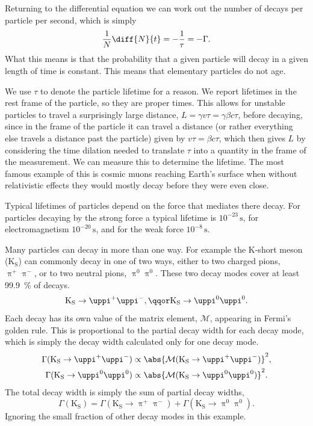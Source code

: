 \documentclass[fleqn]{NotesClass}
\makeatletter
\newcommand{\PBASE@pion}{\uppi}
\newcommand{\Ppiplus}{\ensuremath{\PBASE@pion^+}}
\newcommand{\Ppiminus}{\ensuremath{\PBASE@pion^-}}
\newcommand{\Ppineutral}{\ensuremath{\PBASE@pion^0}}
\newcommand{\Ppizero}{\Ppineutral}
\newcommand{\PBASE@kaon}{\mathrm{K}}
\newcommand{\PKshort}{\ensuremath{\PBASE@kaon_{\mathrm{S}}}}
\newcommand*{\matrixelement}{\mathcal{M}}
\makeatother
\begin{document}
    Returning to the differential equation we can work out the number of decays per particle per second, which is simply
    \begin{equation}
        \frac{1}{N}\diff{N}{t} = -\frac{1}{\tau} = -\Gamma.
    \end{equation}
    What this means is that the probability that a given particle will decay in a given length of time is constant.
    This means that elementary particles do not age.
    
    We use \(\tau\) to denote the particle lifetime for a reason.
    We report lifetimes in the rest frame of the particle, so they are proper times.
    This allows for unstable particles to travel a surprisingly large distance, \(L = \gamma v\tau = \gamma\beta c\tau\), before decaying, since in the frame of the particle it can travel a distance (or rather everything else travels a distance past the particle) given by \(v\tau = \beta c\tau\), which then gives \(L\) by considering the time dilation needed to translate \(\tau\) into a quantity in the frame of the measurement.
    We can measure this to determine the lifetime.
    The most famous example of this is cosmic muons reaching Earth's surface when without relativistic effects they would mostly decay before they were even close.
    
    Typical lifetimes of particles depend on the force that mediates there decay.
    For particles decaying by the strong force a typical lifetime is \(10^{-23}\,\unit{\second}\), for electromagnetism \(10^{-20}\,\unit{\second}\), and for the weak force \(10^{-8}\,\unit{\second}\).
    
    Many particles can decay in more than one way.
    For example the K-short meson (\PKshort) can commonly decay in one of two ways, either to two charged pions, \(\Ppiplus\Ppiminus\), or to two neutral pions, \(\Ppizero\Ppizero\).
    These two decay modes cover at least \qty{99.9}{\percent} of decays.
    \begin{equation}
        \PKshort \to \Ppiplus\Ppiminus, \qqor \PKshort \to \Ppizero\Ppizero.
    \end{equation}
    Each decay has its own value of the matrix element, \(\matrixelement\), appearing in Fermi's golden rule.
    This is proportional to the partial decay width for each decay mode, which is simply the decay width calculated only for one decay mode.
    \begin{align}
        \Gamma(\PKshort \to \Ppiplus\Ppiminus) &\propto \abs{\matrixelement(\PKshort \to \Ppiplus\Ppiminus)}^2,\\
        \Gamma(\PKshort \to \Ppizero\Ppizero) &\propto \abs{\matrixelement(\PKshort \to \Ppizero\Ppizero)}^2.
    \end{align}
    The total decay width is simply the sum of partial decay widths,
    \begin{equation}
        \Gamma(\PKshort) = \Gamma(\PKshort \to \Ppiplus\Ppiminus) + \Gamma(\PKshort \to \Ppizero\Ppizero).
    \end{equation}
    Ignoring the small fraction of other decay modes in this example.
    
\end{document}
